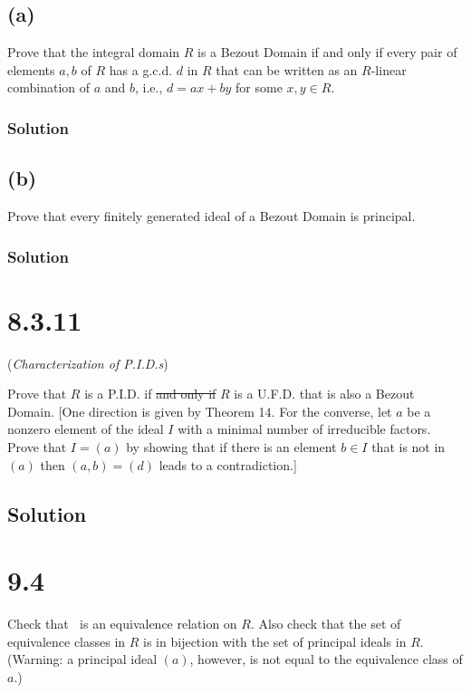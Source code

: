 \documentclass[fleqn]{article}
\begin{document}
        \subsection{(a)}
        Prove that the integral domain $R$ is a Bezout Domain if and only if every pair of elements $a, b$ of $R$ has a g.c.d. $d$ in $R$ that can be written as an $R$-linear combination of $a$ and $b$, i.e., $d = ax + by$ for some $x, y \in R$.
            
            \subsubsection{Solution}
            
        
        \subsection{(b)}
        Prove that every finitely generated ideal of a Bezout Domain is principal.
        
            \subsubsection{Solution}
            
    
    \section{8.3.11}
    (\textit{Characterization of P.I.D.s})
    
    Prove that $R$ is a P.I.D. if \sout{and only if} $R$ is a U.F.D. that is also a Bezout Domain.  [One direction is given by Theorem 14.  For the converse, let $a$ be a nonzero element of the ideal $I$ with a minimal number of irreducible factors.  Prove that $I = (a)$ by showing that if there is an element $b \in I$ that is not in $(a)$ then $(a, b) = (d)$ leads to a contradiction.]
        
        \subsection{Solution}
        
    
    \section{9.4}
    Check that $~$ is an equivalence relation on $R$.  Also check that the set of equivalence classes in $R$ is in bijection with the set of principal ideals in $R$.  (Warning: a principal ideal $(a)$, however, is not equal to the equivalence class of $a$.)
        
\end{document}
